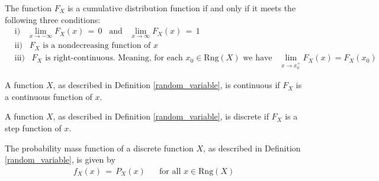 \begin{theorem}
The function $F_{X}$ is a cumulative distribution function if and only if it meets the following three conditions:
\begin{align*}
    &\text{i)} \hspace{10pt} \lim_{x \longrightarrow -\infty} F_{X}(x) \hspace{2pt} = \hspace{2pt} 0 \hspace{10pt} \text{and} \hspace{10pt} \lim_{x \longrightarrow \infty} F_{X}(x) \hspace{2pt} = \hspace{2pt} 1\\[2ex]
    &\text{ii)} \hspace{10pt} F_{X} \hspace{4pt} \text{is a nondecreasing function of} \hspace{4pt} x\\[2ex]
    &\text{iii)} \hspace{10pt} F_{X} \hspace{4pt} \text{is right-continuous. Meaning, for each} \hspace{4pt} x_{0} \in \text{Rng}(X) \hspace{4pt} \text{we have} \hspace{10pt} \lim_{x \longrightarrow x_{0}^{+}} F_{X}(x) = F_{X}(x_{0})
\end{align*}
\end{theorem}

\begin{definition}
A function $X$, as described in Definition \ref{random_variable}, is continuous if $F_{X}$ is a continuous function of $x$.
\end{definition}

\begin{definition}
A function $X$, as described in Definition \ref{random_variable}, is discrete if $F_{X}$ is a step function of $x$.
\end{definition}

\begin{definition}
The probability mass function of a discrete function $X$, as described in Definition \ref{random_variable}, is given by 
\begin{align*}
    f_{X}(x) \hspace{2pt} = \hspace{2pt} P_{X}(x) \hspace{20pt} \text{for all} \hspace{4pt} x \in \text{Rng}(X)
\end{align*}
\label{probability_mass_function}
\end{definition}

